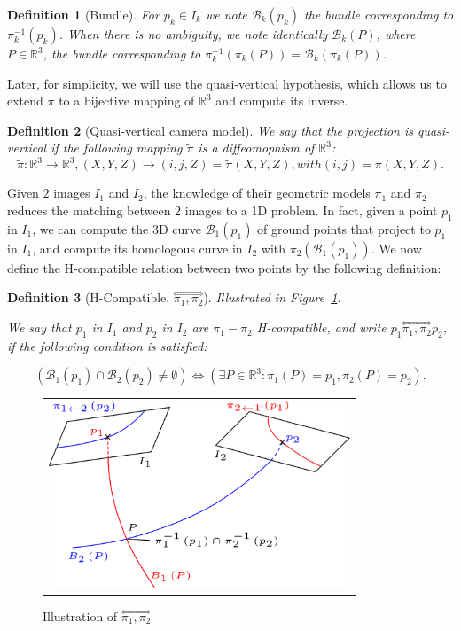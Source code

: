 \documentclass{ipol}
\newcommand{\RR}{\ensuremath{\mathbb{R}}}
\newcommand{\HComp}{\overset{\Longleftrightarrow}{\scriptscriptstyle \pi_1,\pi_2}}
\newcommand{\Bund}[1]{\ensuremath{\mathcal{B}_{#1}}}
\newcommand{\BundO}{\Bund{1}}
\newcommand{\BundT}{\Bund{2}}
\newcommand{\BundK}{\Bund{k}}
\newcommand{\PiVert}{\widetilde{\pi}}
\newtheorem{definition}{Definition}
\begin{document}
\begin{definition}[Bundle]
For $p_k \in I_k$ we note $\BundK(p_k)$  the bundle corresponding 
to $\pi_k^{-1}(p_k)$. When there is no ambiguity,
we note identically  $\BundK(P)$, where $P\in \RR^3$,
 the bundle corresponding to $\pi_k^{-1}(\pi_k(P)) = \BundK(\pi_k(P))$.
\end{definition}


\noindent Later, for simplicity, we will use the  {quasi-vertical} hypothesis, which allows us to extend $\pi$ to a
bijective mapping of $\RR^3$ and compute its inverse.

\begin{definition}[Quasi-vertical camera model]  
We say that the projection is quasi-vertical if the following mapping $\PiVert$ is a diffeomophism of $\RR^3$: \label{DefQuasiVert}
\begin{equation}
  \PiVert :  \RR^3  \rightarrow \RR^3  ,  (X,Y,Z)  \rightarrow (i,j,Z) = \PiVert(X,Y,Z)  , with (i,j) = \pi(X,Y,Z). \label{PiInvert}
\end{equation}
\end{definition}
%
Given $2$ images $I_1$ and $I_2$, the knowledge  of their geometric models $\pi_1$ and  $\pi_2$
reduces the matching between $2$ images to a 1D problem. In fact, given a point $p_1$ in $I_1$,
we can compute the 3D curve $\BundO(p_1)$ of  ground points that project to $p_1$ in $I_1$, and compute its
homologous curve in $I_2$ with $\pi_2(\BundO(p_1))$. We now define the H-compatible relation between two points
by the following definition:

\begin{definition}[H-Compatible, $\HComp$] 
\emph{Illustrated in Figure~\ref{FigNotaComp}.}

We say that $p_1$ in  $I_1$ and $p_2$ in $I_2$ are  $\pi_1-\pi_2$ H-compatible, and write $p_1 \HComp p_2$, if   the following condition is satisfied:

\begin{equation}
   ( \BundO(p_1) \cap  \BundT(p_2) \neq \emptyset    )
    \Leftrightarrow
  (\exists P \in  \RR^3 : \pi_1(P) =p_1 ,  \pi_2(P) = p_2).
\end{equation}
\end{definition}

\begin{figure}[htb!]
\centering
\begin{tabular}{c}
\includegraphics[width=9cm]{FIGS/NotaBundle.png} 
\end{tabular}
\caption{Illustration of $\HComp$}
\label{FigNotaComp}
\end{figure}
\end{document}
